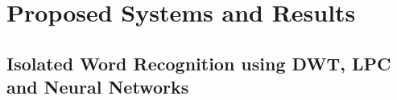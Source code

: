 \documentclass[12pt, a4paper, twoside]{report}
\begin{document}
\chapter{Proposed Systems and Results}
\section{Isolated Word Recognition using DWT, LPC and Neural Networks}
\end{document}
